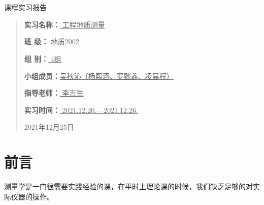 \documentclass[UTF8]{ctexart}
\date{}
\begin{document}
	\begin{figure}[t]
	\end{figure}
	\vskip 0.31746cm

	\begin{center}
		\quad \\
		\quad \\
		\heiti \fontsize{48}{48}
		课程实习报告
	\end{center}
	\vskip 1.7944cm
	
	\begin{quotation}
		\songti \fontsize{15}{15}
		\doublespacing \songti
		\par\setlength {} \centering
		\quad 
		
		\textbf{实习名称：}\underline{\hspace{2.6cm} 工程地质测量 \hspace{2.6cm}}
		
		\textbf{班 \hspace{0.75cm} 级：}\underline{\hspace{3.15cm} 地质2002 \hspace{3.15cm}}
		
		\textbf{组 \hspace{0.75cm} 别：}\underline{\hspace{3.78cm} 4组 \hspace{3.78cm}}
		
		\textbf{小组成员：}\underline{吴秋沁（杨熙涵、罗懿鑫、凌晨程）}
		
		\textbf{指导老师：}\underline{\hspace{3.4cm} 李吉生 \hspace{3.4cm}}
		
		\textbf{实习时间：}\underline{\hspace{1.4cm} 2021.12.20.—2021.12.26. \hspace{1.4cm}}
		
		
		\vskip 5cm
		\centering
		\heiti 
		2021年12月25日
	\end{quotation}


\tableofcontents
\newpage


\section{前言}
	测量学是一门很需要实践经验的课，在平时上理论课的时候，我们缺乏足够的对实际仪器的操作。
	
\end{document}
